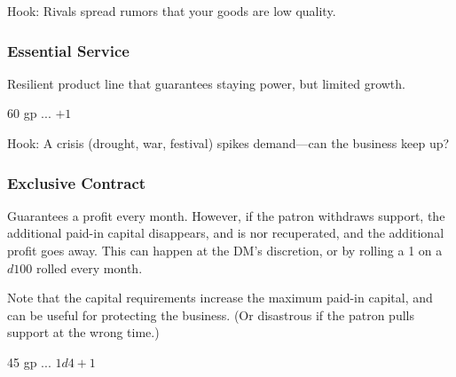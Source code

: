 \documentclass[twocolumn]{dndbook}
\begin{document}
Hook: Rivals spread rumors that your goods are low quality.\par


\subsubsection{Essential Service}


Resilient product line that guarantees staying power, but limited growth.\par

\begin{DndComment}[color=bgtan2018]{}
	\hfill 60 gp
	\hfill ...
	\hfill $+1$
\end{DndComment}



Hook: A crisis (drought, war, festival) spikes demand—can the business keep up?\par


\subsubsection{Exclusive Contract}



Guarantees a profit every month. However, if the patron withdraws support,
the additional paid-in capital disappears, and is nor recuperated, and
the additional profit goes away. This can happen at the DM's discretion,
or by rolling a 1 on a $d100$ rolled every month.\par

Note that the capital requirements increase the maximum paid-in capital,
and can be useful for protecting the business.
(Or disastrous if the patron pulls support at the wrong time.)\par



\begin{DndComment}[color=bgtan2018]{}
	\hfill 45 gp
	\hfill ...
	\hfill $1d4 + 1$
\end{DndComment}
\end{document}

